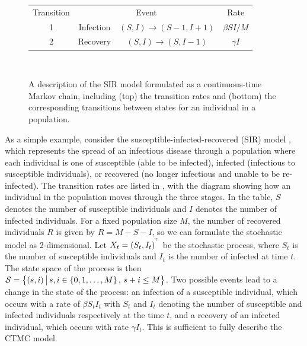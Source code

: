 \usetikzlibrary{automata,positioning,arrows}
\tikzset{->, node distance = 2cm}
\begin{figure}
	\begin{center}
		\begin{tabular}{|c|c|c|c|}
			\hline
			Transition & \multicolumn{2}{c|}{Event} & Rate                                                                  \\ \hhline{|=|=|=|=|}
			1          & Infection                  & \(\left(S, I\right) \to \left(S-1, I + 1\right)\) & \(\beta S I / M\) \\ \hline
			2          & Recovery                   & \(\left(S,I\right) \to \left(S, I - 1\right)\)    & \(\gamma I\)      \\ \hline
		\end{tabular} \\
		\vspace{2mm}
		\caption{A description of the SIR model formulated as a continuous-time Markov chain, including (top) the transition rates and (bottom) the corresponding transitions between states for an individual in a population.}
		\label{fig:sir_transition}
	\end{center}
\end{figure}

As a simple example, consider the susceptible-infected-recovered (SIR) model \citep{Allen_2017_PrimerStochasticEpidemic}, which represents the spread of an infectious disease through a population where each individual is one of susceptible (able to be infected), infected (infectious to susceptible individuals), or recovered (no longer infectious and unable to be re-infected).
The transition rates are listed in , with the diagram showing how an individual in the population moves through the three stages.
In the table, \(S\) denotes the number of susceptible individuals and \(I\) denotes the number of infected individuals.
For a fixed population size \(M\), the number of recovered individuals \(R\) is given by \(R = M - S - I\), so we can formulate the stochastic model as 2-dimensional.
Let \(X_t = \left(S_t,I_t\right)^{^{\!\top}}\) be the stochastic process, where \(S_t\) is the number of susceptible individuals and \(I_t\) is the number of infected at time \(t\).
The state space of the process is then \(\mathcal{S} = \left\{(s,i)\,\middle|\,s,i\in\set{0,1,\dotsc,M}, \, s + i \leq M\right\}\).
Two possible events lead to a change in the state of the process: an infection of a susceptible individual, which occurs with a rate of \(\beta S_t I_t\) with \(S_t\) and \(I_t\) denoting the number of susceptible and infected individuals respectively at the time \(t\), and a recovery of an infected individual, which occurs with rate \(\gamma I_t\).
This is sufficient to fully describe the CTMC model.

